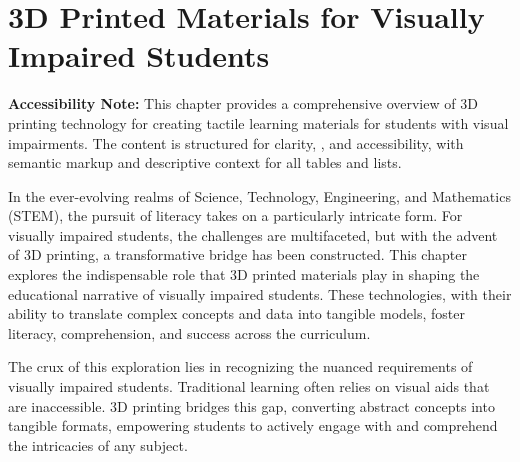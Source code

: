 \chapter{3D Printed Materials for Visually Impaired Students}\label{ch5:3d-printing}
\raggedright

\begin{raggedright}
	\textbf{Accessibility Note:} This chapter provides a comprehensive overview of 3D printing technology for creating tactile learning materials for students with visual impairments. The content is structured for clarity, , and accessibility, with semantic markup and descriptive context for all tables and lists.
\end{raggedright}

In the ever-evolving realms of Science, Technology, Engineering, and Mathematics (STEM), the pursuit of literacy takes on a particularly intricate form. For visually impaired students, the challenges are multifaceted, but with the advent of 3D printing, a transformative bridge has been constructed. This chapter explores the indispensable role that 3D printed materials play in shaping the educational narrative of visually impaired students. These technologies, with their ability to translate complex concepts and data into tangible models, foster literacy, comprehension, and success across the curriculum.\supercite{DassaultEducation, TechLearning2023, TeachThought2021, Karbowski2020}

The crux of this exploration lies in recognizing the nuanced requirements of visually impaired students. Traditional learning often relies on visual aids that are inaccessible. 3D printing bridges this gap, converting abstract concepts into tangible formats, empowering students to actively engage with and comprehend the intricacies of any subject.\supercite{MatterHackers2017, See3D}

